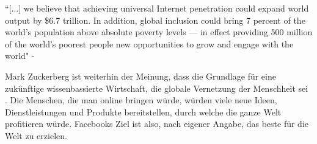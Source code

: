 \documentclass{article}
\begin{document}
``[...] we believe that achieving universal Internet penetration could expand world output by \$6.7 trillion.  
In addition, global inclusion could bring 7 percent of the world’s population above absolute poverty levels — in effect providing 500 
million of the world’s poorest people new opportunities to grow and engage with the world"
- \cite[11]{connectWorld}

\medskip

Mark Zuckerberg ist weiterhin der Meinung, dass die Grundlage für eine zukünftige wissenbassierte Wirtschaft, die globale Vernetzung der Menschheit sei \parencite{HumanRight}.
Die Menschen, die man online bringen würde, würden viele neue Ideen, Dienstleistungen und Produkte bereitstellen, durch welche die ganze Welt profitieren würde.
Facebooks Ziel ist also, nach eigener Angabe, das beste für die Welt zu erzielen.
\end{document}
